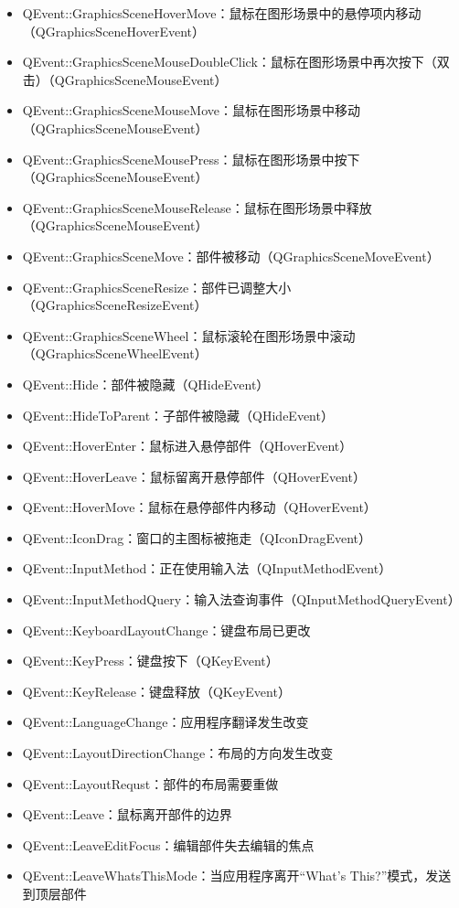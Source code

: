 \begin{itemize}
\item{QEvent::GraphicsSceneHoverMove：鼠标在图形场景中的悬停项内移动（QGraphicsSceneHoverEvent）}
\item{QEvent::GraphicsSceneMouseDoubleClick：鼠标在图形场景中再次按下（双击）（QGraphicsSceneMouseEvent）}
\item{QEvent::GraphicsSceneMouseMove：鼠标在图形场景中移动（QGraphicsSceneMouseEvent）}
\item{QEvent::GraphicsSceneMousePress：鼠标在图形场景中按下（QGraphicsSceneMouseEvent）}
\item{QEvent::GraphicsSceneMouseRelease：鼠标在图形场景中释放（QGraphicsSceneMouseEvent）}
\item{QEvent::GraphicsSceneMove：部件被移动（QGraphicsSceneMoveEvent）}
\item{QEvent::GraphicsSceneResize：部件已调整大小（QGraphicsSceneResizeEvent）}
\item{QEvent::GraphicsSceneWheel：鼠标滚轮在图形场景中滚动（QGraphicsSceneWheelEvent）}
\item{QEvent::Hide：部件被隐藏（QHideEvent）}
\item{QEvent::HideToParent：子部件被隐藏（QHideEvent）}
\item{QEvent::HoverEnter：鼠标进入悬停部件（QHoverEvent）}
\item{QEvent::HoverLeave：鼠标留离开悬停部件（QHoverEvent）}
\item{QEvent::HoverMove：鼠标在悬停部件内移动（QHoverEvent）}
\item{QEvent::IconDrag：窗口的主图标被拖走（QIconDragEvent）}
\item{QEvent::InputMethod：正在使用输入法（QInputMethodEvent）}
\item{QEvent::InputMethodQuery：输入法查询事件（QInputMethodQueryEvent）}
\item{QEvent::KeyboardLayoutChange：键盘布局已更改}
\item{QEvent::KeyPress：键盘按下（QKeyEvent）}
\item{QEvent::KeyRelease：键盘释放（QKeyEvent）}
\item{QEvent::LanguageChange：应用程序翻译发生改变}
\item{QEvent::LayoutDirectionChange：布局的方向发生改变}
\item{QEvent::LayoutRequst：部件的布局需要重做}
\item{QEvent::Leave：鼠标离开部件的边界}
\item{QEvent::LeaveEditFocus：编辑部件失去编辑的焦点}
\item{QEvent::LeaveWhatsThisMode：当应用程序离开“What’s This?”模式，发送到顶层部件}

\end{itemize}

